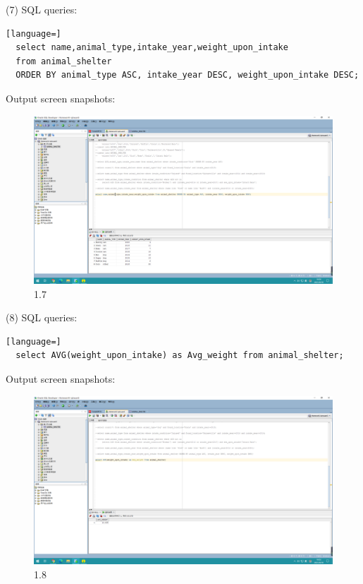 \documentclass[]{article}
\begin{document}
(7) SQL queries:
	\begin{lstlisting}[language=] 
  select name,animal_type,intake_year,weight_upon_intake 
  from animal_shelter 
  ORDER BY animal_type ASC, intake_year DESC, weight_upon_intake DESC;
	\end{lstlisting} 
	Output screen snapshots:
	\begin{figure}[H]
		\centering
		\includegraphics[width=0.9\linewidth]{./document-H1/exercise1/1.7}
		\caption{1.7}
		\label{1.7}
	\end{figure}

(8) SQL queries:
	\begin{lstlisting}[language=] 
  select AVG(weight_upon_intake) as Avg_weight from animal_shelter;
	\end{lstlisting} 
	Output screen snapshots:
	\begin{figure}[H]
		\centering
		\includegraphics[width=0.9\linewidth]{./document-H1/exercise1/1.8}
		\caption{1.8}
		\label{1.8}
	\end{figure}
\end{document}
